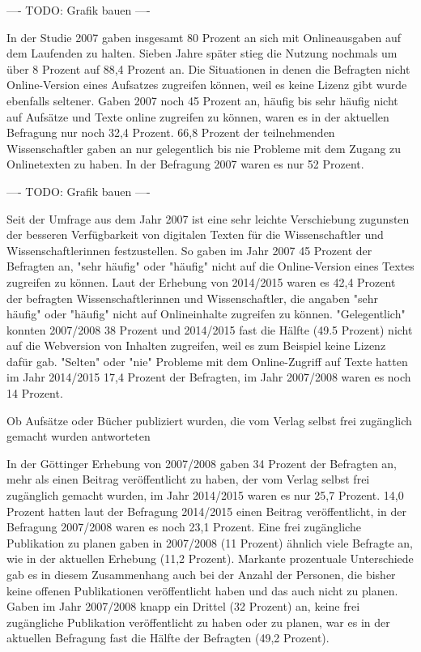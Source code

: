 ---- TODO: Grafik bauen ----

In der Studie 2007 gaben insgesamt 80 Prozent an sich mit Onlineausgaben auf dem Laufenden zu halten. Sieben Jahre später stieg die Nutzung nochmals um über 8 Prozent auf 88,4 Prozent an. Die Situationen in denen die Befragten nicht Online-Version eines Aufsatzes zugreifen können, weil es keine Lizenz gibt wurde ebenfalls seltener. Gaben 2007 noch 45 Prozent an, häufig bis sehr häufig nicht auf Aufsätze und Texte online zugreifen zu können, waren es in der aktuellen Befragung nur noch 32,4 Prozent. 66,8 Prozent der teilnehmenden Wissenschaftler gaben an nur gelegentlich bis nie Probleme mit dem Zugang zu Onlinetexten zu haben. In der Befragung 2007 waren es nur 52 Prozent.

---- TODO: Grafik bauen ----

Seit der Umfrage aus dem Jahr 2007 ist eine sehr leichte Verschiebung zu­guns­ten der besseren Verfügbarkeit von digitalen Texten für die Wissenschaftler und Wissenschaftlerinnen festzustellen. So gaben im Jahr 2007 45 Prozent der Befragten an, "sehr häufig" oder "häufig" nicht auf die Online-Version eines Textes zugreifen zu können. Laut der Erhebung von 2014/2015 waren es 42,4 Prozent der befragten Wissenschaftlerinnen und Wissenschaftler, die angaben "sehr häufig" oder "häufig" nicht auf Onlineinhalte zugreifen zu können. "Gelegentlich" konnten 2007/2008 38 Prozent und 2014/2015 fast die Hälfte (49.5 Prozent) nicht auf die Webversion von Inhalten zugreifen, weil es zum Beispiel keine Lizenz dafür gab. "Selten" oder "nie" Probleme mit dem Online-Zugriff auf Texte hatten im Jahr 2014/2015 17,4 Prozent der Befragten, im Jahr 2007/2008 waren es noch 14 Prozent.

 Ob Aufsätze oder Bücher publiziert wurden, die vom Verlag selbst frei zugänglich gemacht wurden antworteten

In der Göttinger Erhebung von 2007/2008 gaben 34 Prozent der Befragten an, mehr als einen Beitrag veröffentlicht zu haben, der vom Verlag selbst frei zugänglich gemacht wurden, im Jahr 2014/2015 waren es nur 25,7 Prozent. 14,0 Prozent hatten laut der Befragung 2014/2015 einen Beitrag veröffentlicht, in der Befragung 2007/2008 waren es noch 23,1 Prozent. Eine frei zugängliche Publikation zu planen gaben in 2007/2008 (11 Prozent) ähnlich viele Befragte an, wie in der aktuellen Erhebung (11,2 Prozent). Markante prozentuale Unterschiede gab es in diesem Zusammenhang auch bei der Anzahl der Personen, die bisher keine offenen Publikationen veröffentlicht haben und das auch nicht zu planen. Gaben im Jahr 2007/2008 knapp ein Drittel (32 Prozent) an, keine frei zugängliche Publikation veröffentlicht zu haben oder zu planen, war es in der aktuellen Befragung fast die Hälfte der Befragten (49,2 Prozent).

